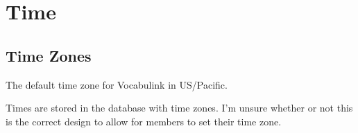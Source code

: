 \chapter{Time}

\section{Time Zones}

The default time zone for Vocabulink in US/Pacific.

Times are stored in the database with time zones. I'm unsure whether or not
this is the correct design to allow for members to set their time zone.
